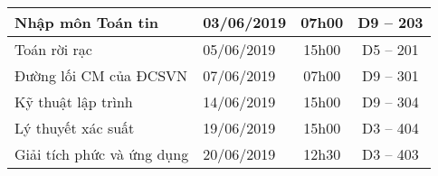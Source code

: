 \documentclass[12pt]{standalone}
\begin{document}
\begin{tabular}{l|l|c|c}
	Nhập môn Toán tin		& 03/06/2019 & 07h00 & D9 -- 203 \\\hline
	Toán rời rạc	 	        & 05/06/2019 & 15h00 & D5 -- 201 \\\hline
	Đường lối CM của ĐCSVN		& 07/06/2019 & 07h00 & D9 -- 301 \\\hline
	Kỹ thuật lập trình		& 14/06/2019 & 15h00 & D9 -- 304 \\\hline
	Lý thuyết xác suất		& 19/06/2019 & 15h00 & D3 -- 404 \\\hline
	Giải tích phức và ứng dụng      & 20/06/2019 & 12h30 & D3 -- 403 
\end{tabular}
\end{document}
